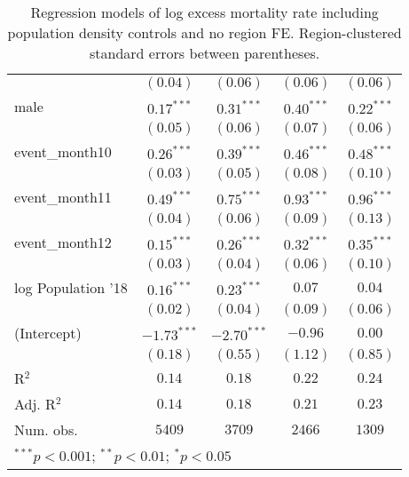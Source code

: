 \begin{table}
\begin{center}
\begin{tabular}{l c c c c}
                   & $(0.04)$      & $(0.06)$      & $(0.06)$      & $(0.06)$      \\
male               & $0.17^{***}$  & $0.31^{***}$  & $0.40^{***}$  & $0.22^{***}$  \\
                   & $(0.05)$      & $(0.06)$      & $(0.07)$      & $(0.06)$      \\
event\_month10     & $0.26^{***}$  & $0.39^{***}$  & $0.46^{***}$  & $0.48^{***}$  \\
                   & $(0.03)$      & $(0.05)$      & $(0.08)$      & $(0.10)$      \\
event\_month11     & $0.49^{***}$  & $0.75^{***}$  & $0.93^{***}$  & $0.96^{***}$  \\
                   & $(0.04)$      & $(0.06)$      & $(0.09)$      & $(0.13)$      \\
event\_month12     & $0.15^{***}$  & $0.26^{***}$  & $0.32^{***}$  & $0.35^{***}$  \\
                   & $(0.03)$      & $(0.04)$      & $(0.06)$      & $(0.10)$      \\
log Population '18 & $0.16^{***}$  & $0.23^{***}$  & $0.07$        & $0.04$        \\
                   & $(0.02)$      & $(0.04)$      & $(0.09)$      & $(0.06)$      \\
(Intercept)        & $-1.73^{***}$ & $-2.70^{***}$ & $-0.96$       & $0.00$        \\
                   & $(0.18)$      & $(0.55)$      & $(1.12)$      & $(0.85)$      \\
\hline
R$^2$              & $0.14$        & $0.18$        & $0.22$        & $0.24$        \\
Adj. R$^2$         & $0.14$        & $0.18$        & $0.21$        & $0.23$        \\
Num. obs.          & $5409$        & $3709$        & $2466$        & $1309$        \\
\hline
\multicolumn{5}{l}{\scriptsize{$^{***}p<0.001$; $^{**}p<0.01$; $^{*}p<0.05$}}
\end{tabular}
\caption{Regression models of log excess mortality rate including population density controls and no region FE. Region-clustered standard errors between parentheses.}
\label{tab:popdensmodels}
\end{center}
\end{table}
